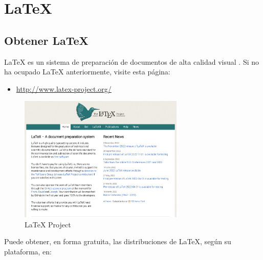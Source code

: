 
\chapter{\LaTeX}


\section{Obtener \LaTeX{}}

\LaTeX{} es un sistema de preparación de documentos de alta calidad
visual \parencite{latex:whatis}. Si no ha ocupado \LaTeX{} anteriormente,
visite esta página:
\begin{itemize}
\item \href{http://www.latex-project.org/}{http://www.latex-project.org/}
\end{itemize}
\begin{figure}[H]
\begin{centering}
\includegraphics[width=0.7\textwidth]{figures/fig_latex_project}
\par\end{centering}

\caption{LaTeX Project}
\end{figure}


Puede obtener, en forma gratuita, las distribuciones de \LaTeX{},
según su plataforma, en:

